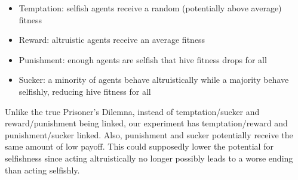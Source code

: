 \documentclass[11pt]{article}
\begin{document}
		\begin{itemize}
		\item Temptation: selfish agents receive a random (potentially above average) fitness
		\item Reward: altruistic agents receive an average fitness
		\item Punishment: enough agents are selfish that hive fitness drops for all
		\item Sucker: a minority of agents behave altruistically while a majority behave selfishly, reducing hive fitness for all
		\end{itemize}
		Unlike the true Prisoner's Dilemna, instead of temptation/sucker and reward/punishment being linked, our experiment has temptation/reward and punishment/sucker linked. Also, punishment and sucker potentially receive the same amount of low payoff. This could supposedly lower the potential for selfishness since acting altruistically no longer possibly leads to a worse ending than acting selfishly.



	


\end{document}
